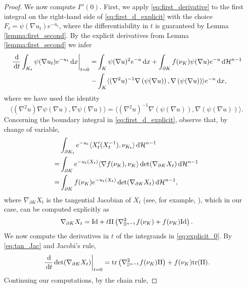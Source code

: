 \documentclass[a4paper, 11pt]{article}
\newcommand{\sph}{\mathbb{S}}
\newcommand{\haus}{\mathcal{H}}
\newcommand{\tra}{\mathrm{tr}}
\newcommand{\Id}{\mathrm{Id}}
\theoremstyle{definition}
\newcommand{\di}{\, \mathrm{d}}
\begin{document}
\begin{proof}
    We now compute $I''(0)$. First, we apply \eqref{eq:first_derivative} to the first integral on the right-hand side of \eqref{eq:first_d_explicit} with the choice $F_t=\psi(\nabla u_t)e^{-u_t}$, where the differentiability in $t$ is guaranteed by Lemma \ref{lemma:first_second}. By the explicit derivatives from Lemma \ref{lemma:first_second} we infer 
    \begin{align} \label{eq:explicit_00}
        \left. \frac{\di}{\di t}\int_{K_t} \psi(\nabla u_t)e^{-u_t}\di x \right|_{t=0}=&\int_K \psi(\nabla u)^2 e^{-u} \di x + \int_{\partial K} f(\nu_K)\psi(\nabla u)e^{-u}\di \haus^{n-1} \\ -&\int_K \langle(\nabla^2 u)^{-1}\nabla \left(\psi(\nabla u)\right),\nabla \left(\psi(\nabla u)\right) \rangle e^{-u}\di x, \notag
    \end{align}
    where we have used the identity \[ \langle(\nabla^2 u)\nabla \psi(\nabla u),\nabla \psi(\nabla u) \rangle=\langle(\nabla^2 u)^{-1}\nabla \left(\psi(\nabla u)\right),\nabla \left(\psi(\nabla u)\right) \rangle.\]
    Concerning the boundary integral in \eqref{eq:first_d_explicit}, observe that, by change of variable,  
    \begin{align} \notag
         &\int_{\partial K_t} e^{-u_t} \langle X'_t(X^{-1}_t),\nu_{K_t} \rangle \di \haus^{n-1}  \\ \label{eq:explicit_0}= & \int_{\partial K}e^{-u_t(X_t)}\langle \nabla f (\nu_K),\nu_K\rangle \det( \nabla_{\partial K} X_t)\di \haus^{n-1}\\ = & \int_{\partial K} f(\nu_K)e^{-u_t(X_t)} \det( \nabla_{\partial K} X_t) \di \haus^{n-1}, \notag
    \end{align}
    where $\nabla_{\partial K} X_t$ is the tangential Jacobian of $X_t$ (see, for example, \cite[Definition 5.4.2]{Henrot_Shape}), which in our case, can be computed explicitly as
    \begin{equation}\label{eq:tan_Jac}
         \nabla_{\partial K} X_t = \Id + t {\rm II}\left(\nabla_{\sph^{n-1}}^2 f (\nu_K) + f(\nu_K)\Id\right).
    \end{equation}
    We now compute the derivatives in $t$ of the integrands in \eqref{eq:explicit_0}. By \eqref{eq:tan_Jac} and Jacobi's rule,
    \begin{equation}\label{eq:explicit_1}
         \left. \frac{\di}{\di t}  \det( \nabla_{\partial K} X_t) \right|_{t=0}= \tra\left(  \nabla_{\sph^{n-1}}^2 f (\nu_K){\rm II}\right)+f(\nu_K)\tra( \rm II).
    \end{equation}
    Continuing our computations, by the chain rule, 

\end{proof}
\end{document}
